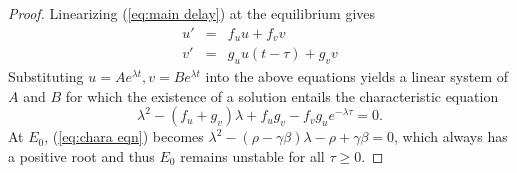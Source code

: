 \documentclass{aims}
\theoremstyle{definition}
\begin{document}
\begin{proof}
Linearizing (\ref{eq:main delay}) at the equilibrium gives
\begin{eqnarray*}
u' & = & f_{u}u+f_{v}v\\
v' & = & g_{u}u(t-\tau)+g_{v}v
\end{eqnarray*}
Substituting $u=Ae^{\lambda t},v=Be^{\lambda t}$
into the above equations yields a linear system of $A$ and $B$ for
which the existence of a solution entails the characteristic equation
\begin{equation}
\lambda^{2}-(f_{u}+g_{v})\lambda+f_{u}g_{v}-f_{v}g_{u}e^{-\lambda\tau}=0.\label{eq:chara eqn}
\end{equation}
At $E_0$, (\ref{eq:chara eqn}) becomes $\lambda^2-(\rho-\gamma\beta)\lambda-\rho+\gamma\beta=0$, which always has a positive root and thus $E_0$ remains unstable for all $\tau\ge0$.


\end{proof}
\end{document}
